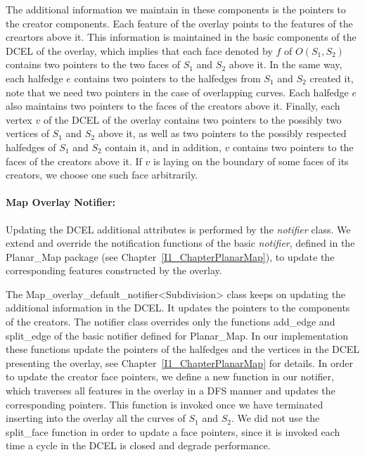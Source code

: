 The additional information we maintain in these components is the pointers 
to the creator components.
Each feature of the overlay points to the features of the creartors above it.
This information is maintained in the basic components of the DCEL of the overlay, 
which implies that each face denoted by $f$ of $O(S_1, S_2)$ contains two pointers 
to the two faces of $S_1$ and $S_2$  above it. 
In the same way, each halfedge $e$ contains two pointers to the halfedges 
from $S_1$ and $S_2$ created it, note that we need two pointers in the case of overlapping curves. 
Each halfedge $e$ also maintains two pointers to the faces of the creators above it. 
Finally, each vertex $v$ of the DCEL of the overlay contains two pointers to the 
possibly two vertices of $S_1$ and $S_2$ above it, 
as well as two pointers to the possibly respected halfedges of $S_1$ and $S_2$ 
contain it, and in addition, $v$ contains two pointers to the 
faces of the creators above it. If $v$ is laying on the boundary of some faces of its creators, 
we choose one such face arbitrarily.

\paragraph{Map Overlay Notifier:}
Updating the DCEL additional attributes is performed by the {\em notifier} class.
We extend and override the notification functions of the basic {\em notifier}, defined 
in the {\ccc Planar_Map} package (see Chapter~\ref{I1_ChapterPlanarMap}), 
to update the corresponding features constructed by the overlay. 

The {\ccc Map_overlay_default_notifier<Subdivision>} class 
keeps on updating the additional information in the DCEL.
It updates the pointers to the components of the creators.
The notifier class overrides only the functions {\ccc add\_edge} 
and {\ccc split\_edge} of the basic notifier defined for {\ccc Planar_Map}.
In our implementation these functions update 
the pointers of the halfedges and the vertices in the DCEL 
presenting the overlay, see Chapter~\ref{I1_ChapterPlanarMap} for details.
In order to update the creator face pointers, we define a new function in our notifier, 
which traverses all features in the overlay in a DFS manner and updates the 
corresponding pointers. This function is invoked once we have terminated 
inserting into the overlay all the curves of $S_1$ and $S_2$.
We did not use the {\ccc split\_face} function in order to update a face pointers, 
since it is invoked each time a cycle in the DCEL is closed and degrade performance. 

